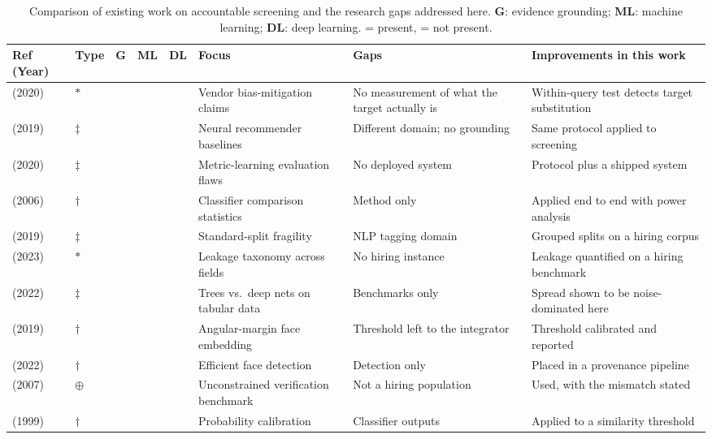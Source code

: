 \documentclass[manuscript,screen,review=false]{acmart}
\newcommand{\yes}{\textcolor{black}{\ding{51}}}
\newcommand{\no}{\textcolor{black}{\ding{55}}}
\begin{document}
\begin{table}[t]
\caption{Comparison of existing work on accountable screening and the research
gaps addressed here. \textbf{G}: evidence grounding; \textbf{ML}: machine
learning; \textbf{DL}: deep learning. \yes{} = present, \no{} = not present.}
\label{tab:related}
\small
\begin{tabular}{@{}llcccp{3.0cm}p{3.2cm}p{3.4cm}@{}}
\toprule
Ref (Year) & Type & G & ML & DL & Focus & Gaps & Improvements in this work \\
\midrule
\cite{raghavan2020hiring} (2020) & $\ast$ & \no & \yes & \no & Vendor bias-mitigation claims & No measurement of what the target actually is & Within-query test detects target substitution \\
\cite{dacrema2019progress} (2019) & $\ddagger$ & \no & \yes & \yes & Neural recommender baselines & Different domain; no grounding & Same protocol applied to screening \\
\cite{musgrave2020reality} (2020) & $\ddagger$ & \no & \no & \yes & Metric-learning evaluation flaws & No deployed system & Protocol plus a shipped system \\
\cite{demsar2006statistical} (2006) & $\dagger$ & \no & \yes & \no & Classifier comparison statistics & Method only & Applied end to end with power analysis \\
\cite{gorman2019splits} (2019) & $\ddagger$ & \no & \yes & \no & Standard-split fragility & NLP tagging domain & Grouped splits on a hiring corpus \\
\cite{kapoor2023leakage} (2023) & $\ast$ & \no & \yes & \yes & Leakage taxonomy across fields & No hiring instance & Leakage quantified on a hiring benchmark \\
\cite{grinsztajn2022tabular} (2022) & $\ddagger$ & \no & \yes & \yes & Trees vs.\ deep nets on tabular data & Benchmarks only & Spread shown to be noise-dominated here \\
\cite{deng2019arcface} (2019) & $\dagger$ & \no & \no & \yes & Angular-margin face embedding & Threshold left to the integrator & Threshold calibrated and reported \\
\cite{guo2022scrfd} (2022) & $\dagger$ & \no & \no & \yes & Efficient face detection & Detection only & Placed in a provenance pipeline \\
\cite{huang2007lfw} (2007) & $\oplus$ & \no & \no & \yes & Unconstrained verification benchmark & Not a hiring population & Used, with the mismatch stated \\
\cite{platt1999probabilistic} (1999) & $\dagger$ & \no & \yes & \no & Probability calibration & Classifier outputs & Applied to a similarity threshold \\

\end{tabular}
\end{table}
\end{document}
